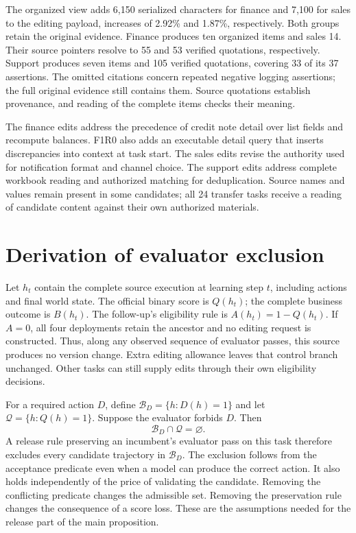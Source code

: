 The organized view adds 6,150 serialized characters for finance and 7,100 for sales to the editing payload, increases of 2.92\% and 1.87\%, respectively. Both groups retain the original evidence. Finance produces ten organized items and sales 14. Their source pointers resolve to 55 and 53 verified quotations, respectively. Support produces seven items and 105 verified quotations, covering 33 of its 37 assertions. The omitted citations concern repeated negative logging assertions; the full original evidence still contains them. Source quotations establish provenance, and reading of the complete items checks their meaning.

The finance edits address the precedence of credit note detail over list fields and recompute balances. F1R0 also adds an executable detail query that inserts discrepancies into context at task start. The sales edits revise the authority used for notification format and channel choice. The support edits address complete workbook reading and authorized matching for deduplication. Source names and values remain present in some candidates; all 24 transfer tasks receive a reading of candidate content against their own authorized materials.

\section{Derivation of evaluator exclusion}
\label{sec:exclusion-proof}

Let $h_t$ contain the complete source execution at learning step $t$, including actions and final world state. The official binary score is $Q(h_t)$; the complete business outcome is $B(h_t)$. The follow-up's eligibility rule is $A(h_t)=1-Q(h_t)$. If $A=0$, all four deployments retain the ancestor and no editing request is constructed. Thus, along any observed sequence of evaluator passes, this source produces no version change. Extra editing allowance leaves that control branch unchanged. Other tasks can still supply edits through their own eligibility decisions.

For a required action $D$, define $\mathcal B_D=\{h:D(h)=1\}$ and let $\mathcal Q=\{h:Q(h)=1\}$. Suppose the evaluator forbids $D$. Then
\begin{equation}
\mathcal B_D\cap\mathcal Q=\varnothing.
\end{equation}
A release rule preserving an incumbent's evaluator pass on this task therefore excludes every candidate trajectory in $\mathcal B_D$. The exclusion follows from the acceptance predicate even when a model can produce the correct action. It also holds independently of the price of validating the candidate. Removing the conflicting predicate changes the admissible set. Removing the preservation rule changes the consequence of a score loss. These are the assumptions needed for the release part of the main proposition.

